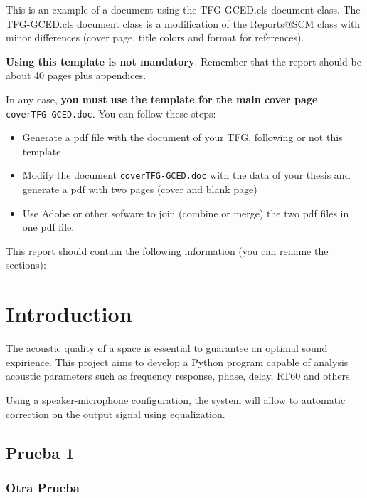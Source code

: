 \documentclass[12,twoside]{TFG-GCED}
\begin{document}
\maketitle

This is an example of a document using the TFG-GCED.cls document class. The TFG-GCED.cls document class is a modification of the Reports@SCM class with minor differences (cover page, title colors and format for references).

\textbf{Using this template is not mandatory}. Remember that the report should be about 40 pages plus appendices.

In any case, \textbf{you must use the template for the main cover page} \texttt{coverTFG-GCED.doc}. You can follow these steps:
\begin{itemize}
	\item Generate a pdf file with the document of your TFG, following or not this template
	\item Modify the document \texttt{coverTFG-GCED.doc} with the data of your thesis and generate a pdf with two pages (cover and blank page)
	\item Use Adobe or other sofware to join (combine or merge) the two pdf files in one pdf file.
\end{itemize}

\newpage
This report should contain the following information (you can rename the sections):
\continguts


\newpage
\color{black}
\section{Introduction}

The acoustic quality of a space is essential to guarantee an optimal sound expirience. This project aims to develop a Python program capable of analysis acoustic parameters such as frequency response, phase, delay, RT60 and others.

Using a speaker-microphone configuration, the system will allow to automatic correction on the output signal using equalization.

\subsection{Prueba 1}
\subsubsection{Otra Prueba}
\end{document}
